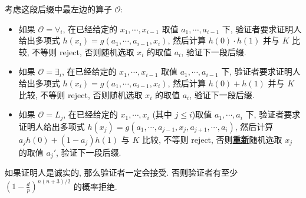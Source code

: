 \documentclass[8pt]{article}
\theoremstyle{compact}
\def\obj#1{\textbf{\uline{#1}}}
\def\le{\leqslant}
\begin{document}
考虑这段后缀中最左边的算子 $\mathcal O$: \begin{itemize}
	\item 如果 $\mathcal O = \forall_i$, 在已经给定的 $x_1, \cdots, x_{i-1}$ 取值 $a_1, \cdots, a_{i-1}$ 下, 验证者要求证明人给出多项式 $h(x_i) = g(a_1, \cdots, a_{i-1}, x_i)$, 然后计算 $h(0) \cdot h(1)$ 并与 $K$ 比较, 不等则 reject, 否则随机选取 $x_i$ 的取值 $a_i$, 验证下一段后缀.
 \item 如果 $\mathcal O = \exists_i$, 在已经给定的 $x_1, \cdots, x_{i-1}$ 取值 $a_1, \cdots, a_{i-1}$ 下, 验证者要求证明人给出多项式 $h(x_i) = g(a_1, \cdots, a_{i-1}, x_i)$, 然后计算 $h(0) + h(1)$ 并与 $K$ 比较, 不等则 reject, 否则随机选取 $x_i$ 的取值 $a_i$, 验证下一段后缀.
 \item 如果 $\mathcal O = L_j$, 在已经给定的 $x_1, \cdots, x_i$ (其中 $j \le i$)取值 $a_1, \cdots, a_i$ 下, 验证者要求证明人给出多项式 $h(x_j) = g(a_1, \cdots, a_{j-1}, x_j, a_{j+1}, \cdots, a_{i})$, 然后计算 $a_jh(0) + (1 - a_j)h(1)$ 与 $K$ 比较, 不等则 reject, 否则\obj{重新}随机选取 $x_j$ 的取值 $a_j'$, 验证下一段后缀.
\end{itemize}

如果证明人是诚实的, 那么验证者一定会接受. 否则验证者有至少 $\left(1 - \frac dp\right)^{n(n+3)/2}$ 的概率拒绝. 
\end{document}
